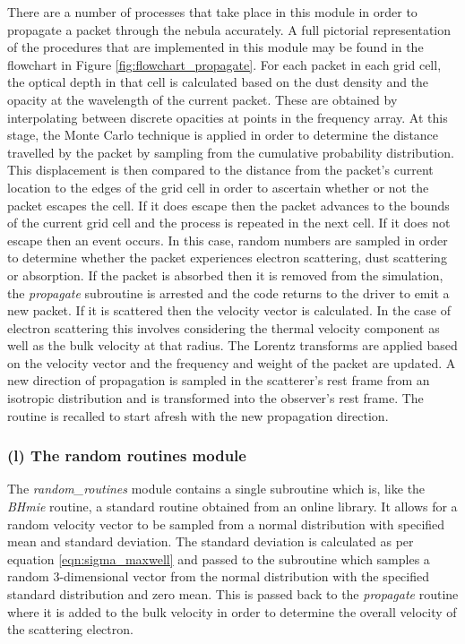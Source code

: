 		There are a number of processes that take place in this module in order to propagate a packet through the nebula accurately.  A full pictorial representation of the procedures that are implemented in this module may be found in the flowchart in Figure \ref{fig:flowchart_propagate}. For each packet in each grid cell, the optical depth in that cell is calculated based on the dust density and the opacity at the wavelength of the current packet.  These are obtained by interpolating between discrete opacities at points in the frequency array.  At this stage, the Monte Carlo technique is applied in order to determine the distance travelled by the packet by sampling from the cumulative probability distribution.  This displacement is then compared to the distance from the packet's current location to the edges of the grid cell in order to ascertain whether or not the packet escapes the cell.  If it does escape then the packet advances to the bounds of the current grid cell and the process is repeated in the next cell.  If it does not escape then an event occurs.  In this case, random numbers are sampled in order to determine whether the packet experiences electron scattering, dust scattering or absorption.  If the packet is absorbed then it is removed from the simulation, the \textit{propagate} subroutine is arrested and the code returns to the driver to emit a new packet.  If it is scattered then the velocity vector is calculated.  In the case of electron scattering this involves considering the thermal velocity component as well as the bulk velocity at that radius.  The Lorentz transforms are applied based on the velocity vector and the frequency and weight of the packet are updated.  A new direction of propagation is sampled in the scatterer's rest frame from an isotropic distribution and is transformed into the observer's rest frame.  The routine is recalled to start afresh with the new propagation direction. 
		
		\subsubsection{(l) The random routines module}
		The \textit{random\_routines} module contains a single subroutine which is, like the \textit{BHmie} routine, a standard routine obtained from an online library.  It allows for a random velocity vector to be sampled from a normal distribution with specified mean and standard deviation.  The standard deviation is calculated as per equation \ref{eqn:sigma_maxwell} and passed to the subroutine which samples a random 3-dimensional vector from the normal distribution with the specified standard distribution and zero mean.  This is passed back to the \textit{propagate} routine where it is added to the bulk velocity in order to determine the overall velocity of the scattering electron.
		
